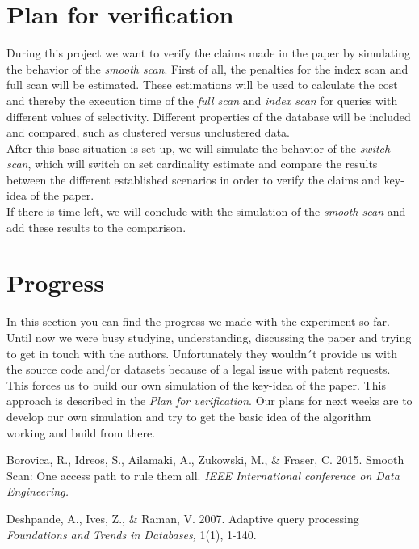 \documentclass[a4paper,11pt,titlepage]{article}
\begin{document}
\section{Plan for verification}
During this project we want to verify the claims made in the paper by simulating the behavior of the \emph{smooth scan}. First of all, the penalties for the index scan and full scan will be estimated. These estimations will be used to calculate the cost and thereby the execution time of the \emph{full scan} and \emph{index scan} for queries with different values of selectivity. Different properties of the database will be included and compared, such as clustered versus unclustered data. \\
After this base situation is set up, we will simulate the behavior of the \emph{switch scan}, which will switch on set cardinality estimate and compare the results between the different established scenarios in order to verify the claims and key-idea of the paper.\\
If there is time left, we will conclude with the simulation of the \emph{smooth scan} and add these results to the comparison.


\section{Progress}
In this section you can find the progress we made with the experiment so far. Until now we were busy studying, understanding, discussing the paper and trying to get in touch with the authors. Unfortunately they wouldn´t provide us with the source code and/or datasets because of a legal issue with patent requests. This forces us to build our own simulation of the key-idea of the paper. This approach is described in the \emph{Plan for verification}. Our plans for next weeks are to develop our own simulation and try to get the basic idea of the algorithm working and build from there.

\begin{thebibliography}{9}

	 Borovica, R., Idreos, S., Ailamaki, A., Zukowski, M., $\&$ Fraser, C.
	2015.	
 	Smooth Scan: One access path to rule them all.
	\emph{IEEE International conference on Data Engineering.}

	Deshpande, A., Ives, Z., $\&$ Raman, V.
	2007.
	Adaptive query processing
	\emph{Foundations and Trends in Databases,}
	1(1), 1-140.
\end{thebibliography}
\end{document}
